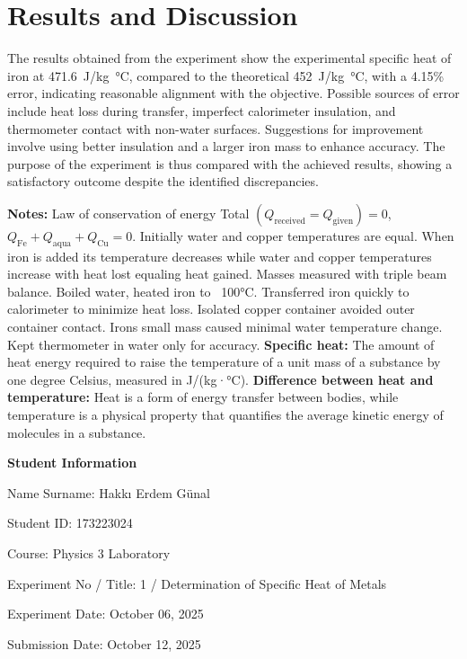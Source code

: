 \documentclass[12pt, a4paper]{article}
\begin{document}
\section{Results and Discussion}
The results obtained from the experiment show the experimental specific heat of iron at \SI{471.6}{J/kg\celsius}, compared to the theoretical \SI{452}{J/kg\celsius}, with a 4.15\% error, indicating reasonable alignment with the objective. Possible sources of error include heat loss during transfer, imperfect calorimeter insulation, and thermometer contact with non-water surfaces. Suggestions for improvement involve using better insulation and a larger iron mass to enhance accuracy. The purpose of the experiment is thus compared with the achieved results, showing a satisfactory outcome despite the identified discrepancies.

\textbf{Notes:}  
Law of conservation of energy Total $(Q_{\text{received}} = Q_{\text{given}}) = 0$, $Q_{\text{Fe}} + Q_{\text{aqua}} + Q_{\text{Cu}} = 0$.  
Initially water and copper temperatures are equal.  
When iron is added its temperature decreases while water and copper temperatures increase with heat lost equaling heat gained.  
Masses measured with triple beam balance.  
Boiled water, heated iron to ~100°C.  
Transferred iron quickly to calorimeter to minimize heat loss.  
Isolated copper container avoided outer container contact.  
Irons small mass caused minimal water temperature change.  
Kept thermometer in water only for accuracy.  
\textbf{Specific heat:} The amount of heat energy required to raise the temperature of a unit mass of a substance by one degree Celsius, measured in J/(kg·°C).  
\textbf{Difference between heat and temperature:} Heat is a form of energy transfer between bodies, while temperature is a physical property that quantifies the average kinetic energy of molecules in a substance.

\newpage

\textbf{Student Information}

Name Surname: Hakkı Erdem Günal

Student ID: 173223024

Course: Physics 3 Laboratory

Experiment No / Title: 1 / Determination of Specific Heat of Metals

Experiment Date: October 06, 2025

Submission Date: October 12, 2025
\end{document}
